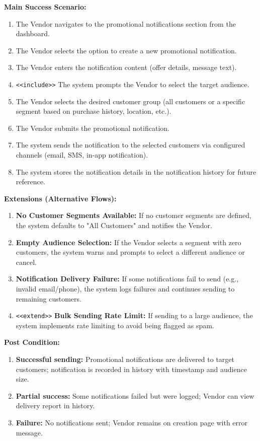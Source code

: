 \textbf{Main Success Scenario:}
\begin{enumerate}
    \item The Vendor navigates to the promotional notifications section from the dashboard.
    \item The Vendor selects the option to create a new promotional notification.
    \item The Vendor enters the notification content (offer details, message text).
    \item \texttt{\textless\textless include\textgreater\textgreater} The system prompts the Vendor to select the target audience.
    \item The Vendor selects the desired customer group (all customers or a specific segment based on purchase history, location, etc.).
    \item The Vendor submits the promotional notification.
    \item The system sends the notification to the selected customers via configured channels (email, SMS, in-app notification).
    \item The system stores the notification details in the notification history for future reference.
\end{enumerate}

\textbf{Extensions (Alternative Flows):}
\begin{enumerate}
    \item[4a.] \textbf{No Customer Segments Available:} If no customer segments are defined, the system defaults to "All Customers" and notifies the Vendor.
    \item[5a.] \textbf{Empty Audience Selection:} If the Vendor selects a segment with zero customers, the system warns and prompts to select a different audience or cancel.
    \item[7a.] \textbf{Notification Delivery Failure:} If some notifications fail to send (e.g., invalid email/phone), the system logs failures and continues sending to remaining customers.
    \item[7b.] \texttt{\textless\textless extend\textgreater\textgreater} \textbf{Bulk Sending Rate Limit:} If sending to a large audience, the system implements rate limiting to avoid being flagged as spam.
\end{enumerate}

\textbf{Post Condition:}
\begin{enumerate}
    \item \textbf{Successful sending:} Promotional notifications are delivered to target customers; notification is recorded in history with timestamp and audience size.
    \item \textbf{Partial success:} Some notifications failed but were logged; Vendor can view delivery report in history.
    \item \textbf{Failure:} No notifications sent; Vendor remains on creation page with error message.
\end{enumerate}


